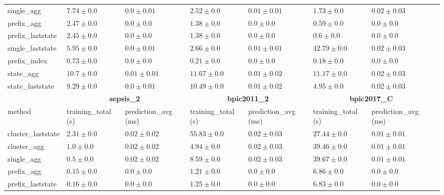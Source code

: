 \documentclass[twoside,11pt]{Latex/Classes/PhDthesisPSnPDF}
\begin{document}
\begin{table}[!htbp]
{\begin{tabular}{llllllll}
			single\_agg & $7.74 \pm 0.0$ & $\mathbf{0.0 \pm 0.01}$ & $2.52 \pm 0.0$ & $0.01 \pm 0.01$ & $1.73 \pm 0.0$ & $0.02 \pm 0.03$ \\ 
			prefix\_agg & $2.47 \pm 0.0$ & $\mathbf{0.0 \pm 0.0}$ & $1.38 \pm 0.0$ & $\mathbf{0.0 \pm 0.0}$ & $0.59 \pm 0.0$ & $\mathbf{0.0 \pm 0.0}$ \\ 
			prefix\_laststate & $2.45 \pm 0.0$ & $\mathbf{0.0 \pm 0.0}$ & $1.38 \pm 0.0$ & $\mathbf{0.0 \pm 0.0}$ & $0.6 \pm 0.0$ & $\mathbf{0.0 \pm 0.0}$ \\ 
			single\_laststate & $5.95 \pm 0.0$ & $\mathbf{0.0 \pm 0.01}$ & $2.66 \pm 0.0$ & $0.01 \pm 0.01$ & $42.79 \pm 0.0$ & $0.02 \pm 0.03$ \\ 
			prefix\_index & $\mathbf{0.73 \pm 0.0}$ & $\mathbf{0.0 \pm 0.0}$ & $\mathbf{0.21 \pm 0.0}$ & $\mathbf{0.0 \pm 0.0}$ & $\mathbf{0.18 \pm 0.0}$ & $\mathbf{0.0 \pm 0.0}$ \\ 
			state\_agg & $10.7 \pm 0.0$ & $0.01 \pm 0.01$ & $11.67 \pm 0.0$ & $0.01 \pm 0.02$ & $11.17 \pm 0.0$ & $0.02 \pm 0.03$ \\ 
			state\_laststate & $9.29 \pm 0.0$ & $\mathbf{0.0 \pm 0.01}$ & $10.49 \pm 0.0$ & $0.01 \pm 0.02$ & $4.95 \pm 0.0$ & $0.02 \pm 0.03$ \\ 
			\bottomrule
			\toprule
			& \multicolumn{2}{c}{{\bfseries sepsis\_2}} & \multicolumn{2}{c}{{\bfseries bpic2011\_2}} & \multicolumn{2}{c}{{\bfseries bpic2017\_C}} \\ \cmidrule(lr){2-3} \cmidrule(lr){4-5} \cmidrule(lr){6-7}
			method  & training\_total (s) & prediction\_avg (ms) & training\_total (s) & prediction\_avg (ms) & training\_total (s) & prediction\_avg (ms) \\ \midrule
			cluster\_laststate & $2.31 \pm 0.0$ & $0.02 \pm 0.02$ & $55.83 \pm 0.0$ & $0.02 \pm 0.03$ & $27.44 \pm 0.0$ & $0.01 \pm 0.01$ \\ 
			cluster\_agg & $1.0 \pm 0.0$ & $0.02 \pm 0.02$ & $4.94 \pm 0.0$ & $0.02 \pm 0.03$ & $39.46 \pm 0.0$ & $0.01 \pm 0.01$ \\ 
			single\_agg & $0.5 \pm 0.0$ & $0.02 \pm 0.02$ & $8.59 \pm 0.0$ & $0.02 \pm 0.03$ & $39.67 \pm 0.0$ & $0.01 \pm 0.01$ \\ 
			prefix\_agg & $0.15 \pm 0.0$ & $\mathbf{0.0 \pm 0.0}$ & $1.21 \pm 0.0$ & $\mathbf{0.0 \pm 0.0}$ & $6.86 \pm 0.0$ & $\mathbf{0.0 \pm 0.0}$ \\ 
			prefix\_laststate & $0.16 \pm 0.0$ & $\mathbf{0.0 \pm 0.0}$ & $1.25 \pm 0.0$ & $\mathbf{0.0 \pm 0.0}$ & $6.83 \pm 0.0$ & $\mathbf{0.0 \pm 0.0}$ \\ 

\end{tabular}}
\end{table}
\end{document}
